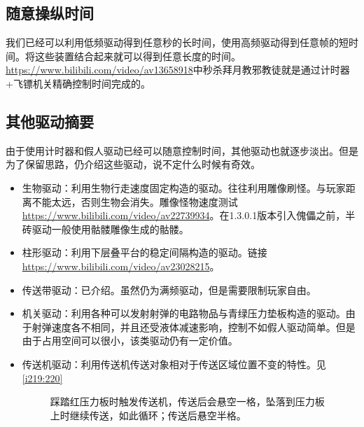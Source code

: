 \subsection{随意操纵时间}
我们已经可以利用低频驱动得到任意秒的长时间，使用高频驱动得到任意帧的短时间。将这些装置结合起来就可以得到任意长度的时间。\url{https://www.bilibili.com/video/av13658918}中秒杀拜月教邪教徒就是通过计时器+飞镖机关精确控制时间完成的。

\subsection{其他驱动摘要}
由于使用计时器和假人驱动已经可以随意控制时间，其他驱动也就逐步淡出。但是为了保留思路，仍介绍这些驱动，说不定什么时候有奇效。
\begin{itemize}
\item 生物驱动：利用生物行走速度固定构造的驱动。往往利用雕像刷怪。与玩家距离不能太远，否则生物会消失。雕像怪物速度测试\url{https://www.bilibili.com/video/av22739934}。在1.3.0.1版本引入傀儡之前，半砖驱动一般使用骷髅雕像生成的骷髅。
\item 柱形驱动：利用下层叠平台的稳定间隔构造的驱动。链接\url{https://www.bilibili.com/video/av23028215}。
\item 传送带驱动：已介绍。虽然仍为满频驱动，但是需要限制玩家自由。
\item 机关驱动：利用各种可以发射射弹的电路物品与青绿压力垫板构造的驱动。由于射弹速度各不相同，并且还受液体减速影响，控制不如假人驱动简单。但是由于占用空间可以很小，该类驱动仍有一定价值。
\item 传送机驱动：利用传送机传送对象相对于传送区域位置不变的特性。见\autoref{i219:220}

\begin{figure}[!ht]
\begin{center}
\qquad
{}
\end{center}
\caption{\protect{}踩踏红压力板时触发传送机，传送后会悬空一格，坠落到压力板上时继续传送，如此循环；\protect{}传送后悬空半格。}
\label{i219:220}
\end{figure}

\end{itemize}

